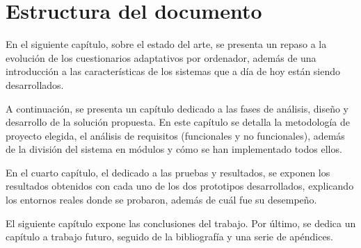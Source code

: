 

\section{Estructura del documento}

En el siguiente capítulo, sobre el estado del arte, se presenta un repaso a la evolución de los cuestionarios adaptativos por ordenador, además de una introducción a las características de los sistemas que a día de hoy están siendo desarrollados. 

A continuación, se presenta un capítulo dedicado a las fases de análisis, diseño y desarrollo de la solución propuesta. En este capítulo se detalla la metodología de proyecto elegida, el análisis de requisitos (funcionales y no funcionales), además de la división del sistema en módulos y cómo se han implementado todos ellos.

En el cuarto capítulo, el dedicado a las pruebas y resultados, se exponen los resultados obtenidos con cada uno de los dos prototipos desarrollados, explicando los entornos reales donde se probaron, además de cuál fue su desempeño.

El siguiente capítulo expone las conclusiones del trabajo. Por último, se dedica un capítulo a trabajo futuro, seguido de la bibliografía y una serie de apéndices. %

